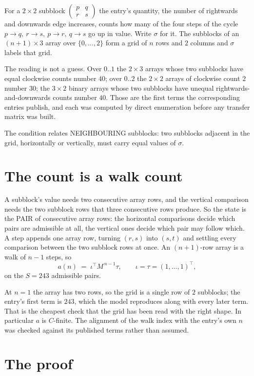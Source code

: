 \documentclass[11pt,a4paper]{article}
\theoremstyle{plain}
\theoremstyle{definition}
\begin{document}
For a $2\times2$ subblock $\begin{pmatrix}p&q\\r&s\end{pmatrix}$ the
entry's quantity, the number of rightwards and downwards edge increases, counts how many of the four steps of the cycle $p\to q,\ r\to s,\ p\to r,\ q\to s$ go up in value. Write $\sigma$ for it. The subblocks of an
$(n+1)\times3$ array over $\{0,\dots,2\}$ form a grid of $n$ rows and $2$
columns and $\sigma$ labels that grid.

The reading is not a guess. Over $0..1$ the $2\times3$ arrays whose two subblocks have equal
clockwise counts number $40$; over $0..2$ the $2\times2$ arrays of clockwise count $2$ number
$30$; the $3\times2$ binary arrays whose two subblocks have unequal rightwards-and-downwards
counts number $40$. Those are the first terms the corresponding entries publish, and each was
computed by direct enumeration before any transfer matrix was built.

The condition relates NEIGHBOURING subblocks: two subblocks adjacent in the grid, horizontally
or vertically, must carry equal values of $\sigma$.

\section{The count is a walk count}

A subblock's value needs two consecutive array rows, and the vertical
comparison needs the two subblock rows that three consecutive rows produce. So the state is the
PAIR of consecutive array rows: the horizontal comparisons decide which pairs are admissible at
all, the vertical ones decide which pair may follow which. A step appends one array row,
turning $(r,s)$ into $(s,t)$ and settling every comparison between the two subblock rows at
once. An $(n+1)$-row array is a walk of $n-1$ steps, so
\[
a(n)\;=\;\iota^{\!\top}M^{\,n-1}\tau,\qquad\iota=\tau=(1,\dots,1)^{\!\top},
\]
on the $S=243$ admissible pairs.

At $n=1$ the array has two rows, so the grid is a single row of $2$
subblocks; the entry's first term is $243$, which the model
reproduces along with every later term. That is the cheapest check that the grid has been read
with the right shape.
In particular $a$ is $C$-finite. The alignment of the walk index with the entry's own $n$ was
checked against its published terms rather than assumed.

\section{The proof}
\end{document}
